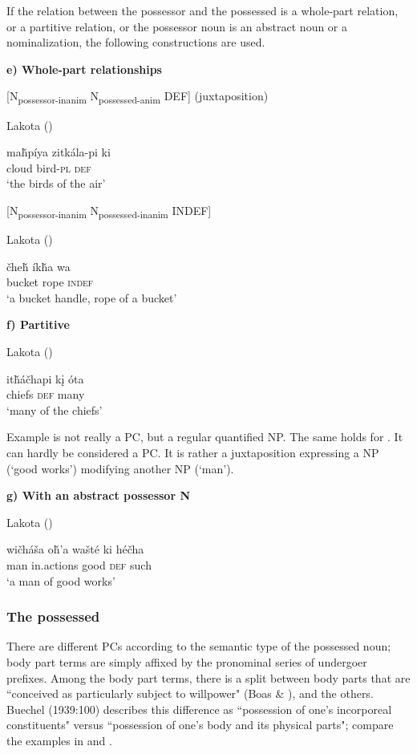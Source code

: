 \documentclass[output=paper]{LSP/langsci}
\begin{document}
If the relation between the possessor and the possessed is a whole-part relation, or a partitive relation, or the possessor noun is an abstract noun or a nominalization, the following constructions are used. 

\vspace{1em}
\textbf{e)	Whole-part relationships}

[N\textsubscript{possessor-inanim} N\textsubscript{possessed-anim} DEF] (juxtaposition)

\ea Lakota (\citealt[92]{Buechel1939})

\gll ma\v{h}píya zitkála-pi  ki  \\
cloud      bird-\textsc{pl} \textsc{def} \\
\glt `the birds of the air'
\z

[N\textsubscript{possessor-inanim} N\textsubscript{possessed-inanim} INDEF] 

\ea Lakota (\citealt[92]{Buechel1939})

\gll  \v{c}he\v{h} \'ik\v{h}a wa \\  
bucket rope \textsc{indef} \\
\glt `a bucket handle, rope of a bucket' 
\z 

\textbf{f)	Partitive}

\ea Lakota (\citealt[93]{Buechel1939}) \label{lakotamanychiefs}

\gll it\v{h}\'a\v{c}hapi k\k{i} \'ota \\
chiefs \textsc{def} many \\
\glt `many of the chiefs'
\z

Example  is not really a PC, but a regular quantified NP. The same holds for . It can hardly be considered a PC. It is rather a juxtaposition expressing a NP (`good works') modifying another NP (`man').

\vspace{1em}

\textbf{g)	With an abstract possessor N}

\ea Lakota (\citealt[93]{Buechel1939}) \label{lakotagoodworks}

\gll wi\v{c}háša o\v{h}'a     wašté ki     hé\v{c}ha \\
man       in.actions good  \textsc{def} such \\
\glt `a man of good works'
\z

\subsubsection{The possessed}
There are different PCs according to the semantic type of the possessed noun; body part terms are simply affixed by the pronominal series of undergoer prefixes. Among the body part terms, there is a split between body parts that are ``conceived as particularly subject to willpower" (Boas \& \citealt[128]{Deloria1941}), and the others. Buechel (1939:100) describes this difference as ``possession of one's incorporeal constituents" versus ``possession of one's body and its physical parts"; compare the examples in  and .
\end{document}

